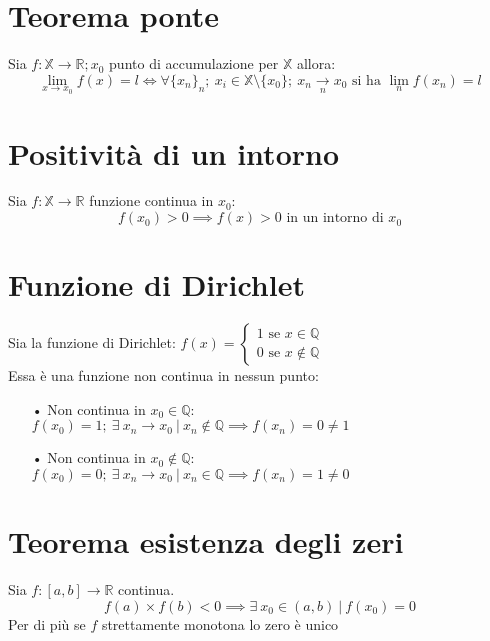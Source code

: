 \section{Teorema ponte}
Sia $f: \mathbb{X} \to \mathbb{R}; x_0$ punto di accumulazione per $\mathbb{X}$ allora:
\begin{equation}
\displaystyle \lim_{x \to x_0}f(x) = l \iff \forall \{x_n\}_n;\ x_i \in \mathbb{X} \setminus \{x_0\};\ x_n \xrightarrow[n]{} x_0 \text{ si ha } \lim_{n}f(x_n) = l
\end{equation}

\section{Positività di un intorno}
Sia $f: \mathbb{X} \to \mathbb{R}$ funzione continua in $x_0$:
\begin{equation}
f(x_0) > 0 \implies f(x) > 0 \text{ in un intorno di } x_0
\end{equation}

\section{Funzione di Dirichlet}
Sia la funzione di Dirichlet: $f(x) = 
\begin{cases}
1 \text{ se } x \in \mathbb{Q}\\
0 \text{ se } x \not \in \mathbb{Q}
\end{cases}$\\
Essa è una funzione non continua in nessun punto:
\begin{enumerate}
\item[•] Non continua in $x_0 \in \mathbb{Q}$:\\
$f(x_0) = 1;\ \exists\ x_n \to x_0\ |\ x_n \not \in \mathbb{Q} \implies f(x_n) = 0 \neq 1$
\item[•] Non continua in $x_0 \not \in \mathbb{Q}$:\\
$f(x_0) = 0;\ \exists\ x_n \to x_0\ |\ x_n \in \mathbb{Q} \implies f(x_n) = 1 \neq 0$ 
\end{enumerate}

\section{Teorema esistenza degli zeri}
Sia $f: [a,b] \to \mathbb{R}$ continua.
\begin{equation}
f(a) \times f(b) < 0 \implies \exists\ x_0 \in (a,b)\ |\ f(x_0) = 0
\end{equation}
Per di più se $f$ strettamente monotona lo zero è unico
